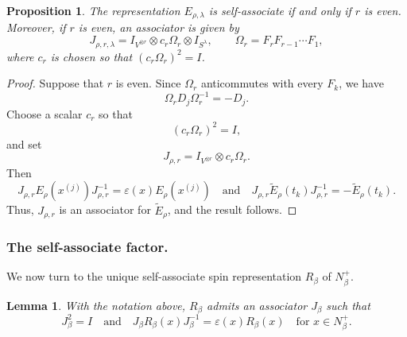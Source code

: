 \documentclass[reqno]{amsart}
\newtheorem{lemma}[theorem]{Lemma}     %
\newtheorem{proposition}[theorem]{Proposition}
\theoremstyle{definition}
\begin{document}
\begin{proposition}
\label{prop:asso1}
The representation $E_{\rho,\lambda}$ is self-associate if and only if $r$
is even. Moreover, if $r$ is even, an associator is given by
\[
J_{\rho,r,\lambda}
=
I_{V^{\otimes r}}\otimes c_r\Omega_r\otimes I_{S^\lambda},
\qquad
\Omega_r=F_rF_{r-1}\cdots F_1,
\]
where $c_r$ is chosen so that $(c_r\Omega_r)^2=I$.
\end{proposition}

\begin{proof}
Suppose that $r$ is even. 
Since $\Omega_r$ anticommutes with every $F_k$, we have
\[
\Omega_rD_j\Omega_r^{-1}
=
-D_j.
\]
Choose a scalar $c_r$ so that
\[
(c_r\Omega_r)^2=I,
\]
and set
\[
J_{\rho,r}
=
I_{V^{\otimes r}}\otimes c_r\Omega_r.
\]
Then
\[
J_{\rho,r}E_\rho(x^{(j)})J_{\rho,r}^{-1}
=
\varepsilon(x)E_\rho(x^{(j)})
\quad\text{and}\quad
J_{\rho,r}\widetilde{E}_\rho(t_k)J_{\rho,r}^{-1}
=
-\widetilde{E}_\rho(t_k).
\]
Thus, $J_{\rho,r}$ is an associator for $\widetilde{E}_\rho$, and the
result follows.
\end{proof}

\subsubsection{The self-associate factor.}

We now turn to the unique self-associate spin representation $R_\beta$ of
$N_\beta^+$.

\begin{lemma}
With the notation above, $R_\beta$ admits an associator $J_\beta$ such that
\begin{equation}
\label{eq:assoD}
J_\beta^2=I
\quad\text{and}\quad
J_\beta R_\beta(x)J_\beta^{-1}
=
\varepsilon(x)R_\beta(x)
\quad \text{for }x\in N_\beta^+.
\end{equation}
\end{lemma}
\end{document}
